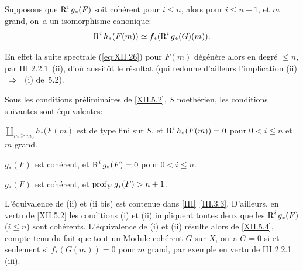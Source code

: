 \begin{corollaire} \label{XII.5.4}
Supposons que $\operatorname{R}^ig_\ast(F)$ soit coh\'erent pour $i\leq n$, alors pour $i\leq n+1$, et $m$ grand, on~a un isomorphisme canonique:
\[
\operatorname{R}^ih_\ast(F(m)) \simeq f_\ast(\operatorname{R}^ig_\ast(G)(m)).
\]
\end{corollaire}

En effet la suite spectrale (\ref{eq:XII.26}) pour $F(m)$ d\'eg\'en\`ere alors en degr\'e $\leq n$, par \EGA III 2.2.1~(ii), d'o\`u aussit\^{o}t le r\'esultat (qui redonne d'ailleurs l'implication (ii) ~$\To$~ (i) de~5.2).

\enlargethispage{1.2\baselineskip}%
\begin{corollaire} \label{XII.5.5}
Sous les conditions pr\'eliminaires de \ref{XII.5.2}, $S$ noeth\'erien, les conditions suivantes sont \'equivalentes:
\begin{enumeratei}
\item
$\coprod_{m\geq m_0}h_\ast(F(m)$ est de type fini sur $S$, et $\operatorname{R}^ih_\ast(F(m))=0$ pour $0<i\leq n$ et $m$ grand.
\item
$g_\ast(F)$ est coh\'erent, et $\operatorname{R}^ig_\ast(F)=0$ pour $0<i\leq n$.
\item[\textup{(ii bis)}] $g_\ast(F)$ est coh\'erent, et $\operatorname{prof}_Y g_\ast(F)>n+1$.
\end{enumeratei}
\end{corollaire}

L'\'equivalence de (ii) et (ii bis) est contenue dans \ref{III}~\ref{III.3.3}. D'ailleurs, en vertu de \ref{XII.5.2} les conditions (i) et (ii) impliquent toutes deux que les $\operatorname{R}^ig_\ast(F)$ ($i\leq n$) sont coh\'erents. L'\'equivalence de (i) et (ii) r\'esulte alors de \ref{XII.5.4}, compte tenu du fait que tout un Module coh\'erent $G$ sur $X$, on~a $G=0$ si et seulement si $f_\ast(G(m))=0$ pour $m$ grand, par exemple en vertu de \EGA III 2.2.1 (iii).

